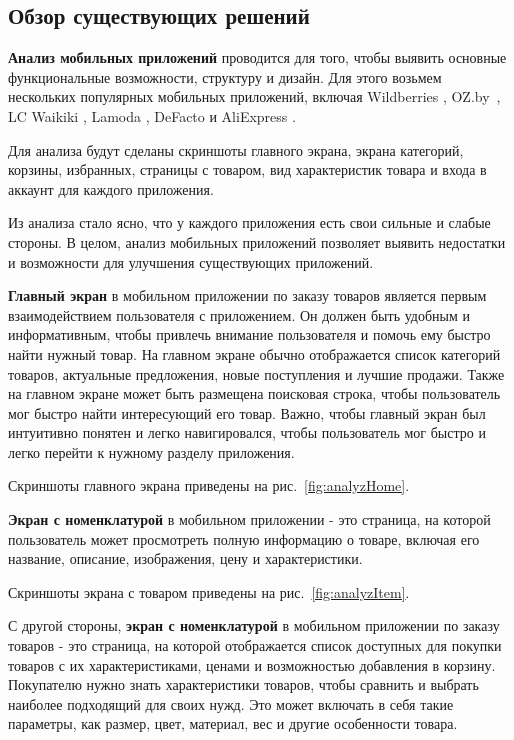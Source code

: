\subsection{Обзор существующих решений}

\textbf{Анализ мобильных приложений} проводится для того, чтобы выявить основные функциональные возможности, структуру и дизайн.
Для этого возьмем нескольких популярных мобильных приложений, включая
Wildberries \cite{AndroidWildberries},
OZ.by~\cite{AndroidOzBy},
LC Waikiki \cite{AndroidLcWaikiki},
Lamoda \cite{AndroidLamoda},
DeFacto \cite{AndroidDefacto}
и AliExpress \cite{AndroidAliExpress}.

Для анализа будут сделаны скриншоты главного экрана, экрана категорий, корзины, избранных, страницы с товаром, вид характеристик товара и входа в аккаунт
для каждого приложения.

Из анализа стало ясно, что у каждого приложения есть свои сильные и слабые стороны.
В целом, анализ мобильных приложений позволяет выявить недостатки и возможности для улучшения существующих приложений.

\textbf{Главный экран} в мобильном приложении по заказу товаров является первым взаимодействием пользователя с приложением.
Он должен быть удобным и информативным, чтобы привлечь внимание пользователя и помочь ему быстро найти нужный товар.
На главном экране обычно отображается список категорий товаров, актуальные предложения, новые поступления и лучшие продажи.
Также на главном экране может быть размещена поисковая строка, чтобы пользователь мог быстро найти интересующий его товар.
Важно, чтобы главный экран был интуитивно понятен и легко навигировался, чтобы пользователь мог быстро и легко перейти к нужному разделу приложения.

Скриншоты главного экрана приведены на рис.~\ref{fig:analyzHome}.

\textbf{Экран с номенклатурой} в мобильном приложении - это страница, на которой пользователь может просмотреть полную информацию о товаре,
включая его название, описание, изображения, цену и характеристики.

Скриншоты экрана с товаром приведены на рис.~\ref{fig:analyzItem}.

С другой стороны, \textbf{экран с номенклатурой} в мобильном приложении по заказу товаров - это страница,
на которой отображается список доступных для покупки товаров с их характеристиками,
ценами и возможностью добавления в корзину.
Покупателю нужно знать характеристики товаров,
чтобы сравнить и выбрать наиболее подходящий для своих нужд.
Это может включать в себя такие параметры, как размер, цвет, материал, вес и другие особенности товара.

